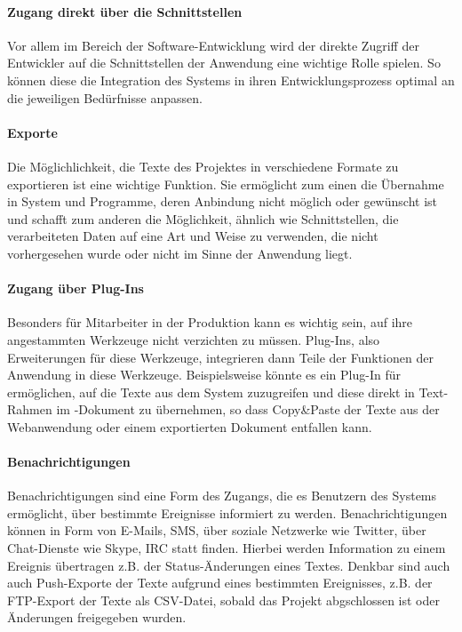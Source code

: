 \paragraph{Zugang direkt über die Schnittstellen} Vor allem im Bereich der Software-Entwicklung wird der direkte Zugriff der Entwickler auf die Schnittstellen der Anwendung eine wichtige Rolle spielen. So können diese die Integration des Systems in ihren Entwicklungsprozess optimal an die jeweiligen Bedürfnisse anpassen.

\paragraph{Exporte} Die Möglichlichkeit, die Texte des Projektes in verschiedene Formate zu exportieren ist eine wichtige Funktion. Sie ermöglicht zum einen die Übernahme in System und Programme, deren Anbindung nicht möglich oder gewünscht ist und schafft zum anderen die Möglichkeit, ähnlich wie Schnittstellen, die verarbeiteten Daten auf eine Art und Weise zu verwenden, die nicht vorhergesehen wurde oder nicht im Sinne der Anwendung liegt.

\paragraph{Zugang über Plug-Ins} Besonders für Mitarbeiter in der Produktion kann es wichtig sein, auf ihre angestammten Werkzeuge nicht verzichten zu müssen. Plug-Ins, also Erweiterungen für diese Werkzeuge, integrieren dann Teile der Funktionen der Anwendung in diese Werkzeuge. Beispielsweise könnte es ein Plug-In für  ermöglichen, auf die Texte aus dem System zuzugreifen und diese direkt in Text-Rahmen im -Dokument zu übernehmen, so dass Copy\&Paste der Texte aus der Webanwendung oder einem exportierten Dokument entfallen kann.

\paragraph{Benachrichtigungen} Benachrichtigungen sind eine Form des Zugangs, die es Benutzern des Systems ermöglicht, über bestimmte Ereignisse informiert zu werden. Benachrichtigungen können in Form von E-Mails, SMS, über soziale Netzwerke wie Twitter, über Chat-Dienste wie Skype, IRC statt finden. Hierbei werden Information zu einem Ereignis übertragen z.B. der Status-Änderungen eines Textes. Denkbar sind auch auch Push-Exporte der Texte aufgrund eines bestimmten Ereignisses, z.B. der FTP-Export der Texte als CSV-Datei, sobald das Projekt abgschlossen ist oder Änderungen freigegeben wurden.

